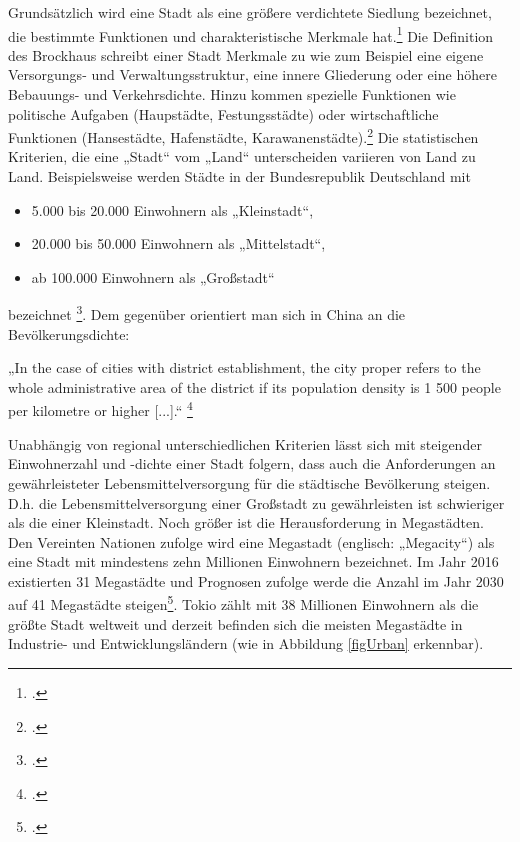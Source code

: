 \documentclass{scrartcl}
\begin{document}
Grundsätzlich wird eine Stadt als eine größere verdichtete Siedlung bezeichnet, die bestimmte Funktionen und charakteristische Merkmale hat.\footcite{HaasDefinitionWirtschaftslexikon} Die Definition des Brockhaus schreibt einer Stadt Merkmale zu wie zum Beispiel eine eigene Versorgungs- und Verwaltungsstruktur, eine innere Gliederung oder eine höhere Bebauungs- und Verkehrsdichte. Hinzu kommen spezielle Funktionen wie politische Aufgaben (Haupstädte, Festungsstädte) oder wirtschaftliche Funktionen (Hansestädte, Hafenstädte, Karawanenstädte).\footcite{BrockhausStadt} Die statistischen Kriterien, die eine „Stadt“ vom „Land“ unterscheiden variieren von Land zu Land. Beispielsweise werden Städte in der Bundesrepublik Deutschland mit 
\begin{itemize}
\item 5.000 bis 20.000 Einwohnern als „Kleinstadt“,
\item 20.000 bis 50.000 Einwohnern als „Mittelstadt“,
\item ab 100.000 Einwohnern als „Großstadt“ 
\end{itemize}
bezeichnet \footcite{Bssr}. Dem gegenüber orientiert man sich in China an die Bevölkerungsdichte: 

\begin{displayquote}
„In the case of cities with district establishment, the city proper refers to the whole administrative area of the district if its population density is 1 500 people per kilometre or higher [...].“ \footcite[S.~2]{UnitedNations2005Table2005} 
\end{displayquote}

Unabhängig von regional unterschiedlichen Kriterien lässt sich mit steigender Einwohnerzahl und -dichte einer Stadt folgern, dass auch die Anforderungen an gewährleisteter Lebensmittelversorgung für die städtische Bevölkerung steigen. D.h. die Lebensmittelversorgung einer Großstadt zu gewährleisten ist schwieriger als die einer Kleinstadt. Noch größer ist die Herausforderung in Megastädten. Den Vereinten Nationen zufolge wird eine Megastadt (englisch: „Megacity“) als eine Stadt mit mindestens zehn Millionen Einwohnern bezeichnet. Im Jahr 2016 existierten 31 Megastädte und Prognosen zufolge werde die Anzahl im Jahr 2030 auf 41 Megastädte steigen\footcite{UnitedNations2016The2016}. Tokio zählt mit 38 Millionen Einwohnern als die größte Stadt weltweit und derzeit befinden sich die meisten Megastädte in Industrie- und Entwicklungsländern (wie in Abbildung \ref{figUrban} erkennbar). 
\end{document}
